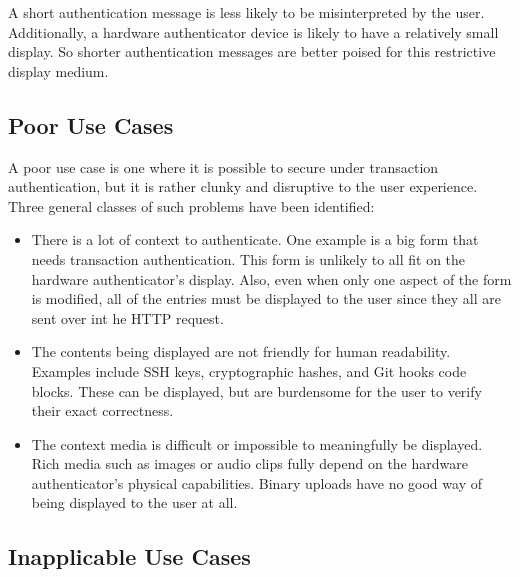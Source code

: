 A short authentication message is less likely to be misinterpreted by the user. Additionally, a hardware authenticator device is likely to have a relatively small display. So shorter authentication messages are better poised for this restrictive display medium. 


\subsection{Poor Use Cases}

A poor use case is one where it is possible to secure under transaction authentication, but it is rather clunky and disruptive to the user experience. Three general classes of such problems have been identified:

\begin{itemize}[nosep]

\item There is a lot of context to authenticate. One example is a big form that needs transaction authentication. This form is unlikely to all fit on the hardware authenticator's display. Also, even when only one aspect of the form is modified, all of the entries must be displayed to the user since they all are sent over int he HTTP request.

\item The contents being displayed are not friendly for human readability. Examples include SSH keys, cryptographic hashes, and Git hooks code blocks. These can be displayed, but are burdensome for the user to verify their exact correctness.

\item The context media is difficult or impossible to meaningfully be displayed. Rich media such as images or audio clips fully depend on the hardware authenticator's physical capabilities. Binary uploads have no good way of being displayed to the user at all.

\end{itemize}


\subsection{Inapplicable Use Cases}

